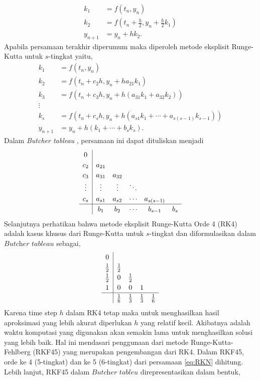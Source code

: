 \begin{spacing}{1.5}
	\begin{equation*}
		\begin{aligned}
			k_1 &= f(t_n,y_n) \\
			k_2 &= f(t_n+\frac{h}{2},y_n+\frac{h}{2}k_1) \\
			y_{n+1}&=y_n+hk_2.
		\end{aligned}
	\end{equation*}
	Apabila persamaan terakhir diperumum maka diperoleh metode eksplisit Runge-Kutta untuk $s$-tingkat yaitu,
	\begin{equation}\label{eq:RKN}
		\begin{aligned}
			k_1 &= f(t_n,y_n) \\
			k_2 &= f(t_n+c_2h,y_n+ha_{21}k_1) \\
			k_3 &= f(t_n+c_3h,y_n+h(a_{31}k_1+a_{32}k_2)) \\
			\vdots \\
			k_s &= f(t_n+c_sh,y_n+h(a_{s1}k_1+\cdots +a_{s(s-1)}k_{s-1})) \\
			y_{n+1}&=y_n+h(k_1+\cdots+b_sk_s).
		\end{aligned}
	\end{equation}
	Dalam \textit{Butcher tableau} , persamaan ini dapat dituliskan menjadi 
	\[
	\renewcommand\arraystretch{1.2}
	\begin{array}
		{c|ccccc}
		0\\
		c_2 & a_{21}\\
		c_3 & a_{31} & a_{32} \\
		\vdots& \vdots& \vdots& \ddots \\
		c_s & a_{s1} & a_{s2} & \cdots & a_{s(s-1)} \\
		\hline
		& b_1 & b_2 & \cdots & b_{s-1} & b_s
	\end{array}
	\]
	Selanjutnya perhatikan bahwa metode eksplisit Runge-Kutta Orde 4 (RK4) adalah kasus khusus dari Runge-Kutta untuk $s$-tingkat dan diformulasikan dalam $\textit{Butcher tableau}$ sebagai,
	\[
	\renewcommand\arraystretch{1.2}
	\begin{array}
		{c|cccc}
		0\\
		\frac{1}{2} & \frac{1}{2}\\
		\frac{1}{2} &0 &\frac{1}{2} \\
		1& 0& 0& 1\\
		\hline
		& \frac{1}{6} &\frac{1}{3} &\frac{1}{3} &\frac{1}{6} 
	\end{array}
	\]
	Karena time step $h$ dalam RK4 tetap maka untuk menghasilkan hasil aproksimasi yang lebih akurat diperlukan $h$ yang relatif kecil. Akibatnya adalah waktu komputasi yang digunakan akan semakin lama untuk menghasilkan solusi yang lebih baik. Hal ini mendasari penggunaan dari metode Runge-Kutta-Fehlberg (RKF45) yang merupakan pengembangan dari RK4. Dalam RKF45, orde ke 4 (5-tingkat) dan ke 5 (6-tingkat) dari persamaan \ref{eq:RKN} dihitung. Lebih lanjut, RKF45 dalam $\textit{Butcher tableu}$ direpresentasikan dalam bentuk,

\end{spacing}
